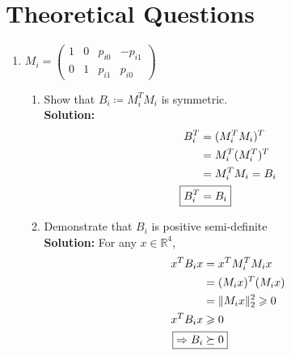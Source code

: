 \documentclass[letta4 paper]{article}
\DeclarePairedDelimiter{\norm}{\lVert}{\rVert}
\numberwithin{equation}{section}
\newcommand{\0}{\mathbf{0}}
\begin{document}
\section{Theoretical Questions}
\begin{enumerate}
	\item $M_{i}=\left(\begin{array}{cccc}{1} & {0} & {p_{i 0}} & {-p_{i 1}} \\ {0} & {1} & {p_{i 1}} & {p_{i 0}}\end{array}\right)$
	\begin{enumerate}
		\item Show that $B_{i} \coloneqq M_{i}^{T} M_{i}$ is symmetric. \\
		\textbf{Solution:}
		\begin{align}
			B_i^T &= (M_i^T M_i)^T \\
			&= M_i^T (M_i^T)^T \\
			&= M_i^T M_i=B_i \\
			\Aboxed{B_i^T &= B_i}
		\end{align}
		
		
		\item Demonstrate that $B_{i}$ is positive semi-definite\\
		\textbf{Solution:}
		For any $x\in \mathbb{R}^4$,
		\begin{align}
			x^T B_i x &= x^T M_i^T M_i x \\
			&= (M_i x)^T (M_i x) \\
			&= \norm{M_i x}_2^2 \geqslant 0 \\
			x^T B_i x &\geqslant 0\\
			\Aboxed{\Rightarrow B_i &\succeq 0}
		\end{align}
		
	\end{enumerate}
	

\end{enumerate}
\end{document}
